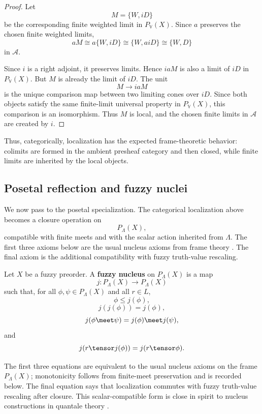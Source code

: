 \begin{proof}
Let
\[
    M=\{W,iD\}
\]
be the corresponding finite weighted limit in \(P_{\mathbb V}(X)\). Since \(a\)
preserves the chosen finite weighted limits,
\[
    aM
    \cong
    a\{W,iD\}
    \cong
    \{W,aiD\}
    \cong
    \{W,D\}
\]
in \(\mathcal A\).

Since \(i\) is a right adjoint, it preserves limits. Hence \(iaM\) is also a limit of
\(iD\) in \(P_{\mathbb V}(X)\). But \(M\) is already the limit of \(iD\). The unit
\[
    M\to iaM
\]
is the unique comparison map between two limiting cones over \(iD\). Since both
objects satisfy the same finite-limit universal property in \(P_{\mathbb V}(X)\),
this comparison is an isomorphism. Thus \(M\) is local, and the chosen finite limits
in \(\mathcal A\) are created by \(i\).
\end{proof}

Thus, categorically, localization has the expected frame-theoretic behavior: colimits
are formed in the ambient presheaf category and then closed, while finite limits are
inherited by the local objects.

\subsection{Posetal reflection and fuzzy nuclei}
\label{subsec:localizing-presheaves-posetal-reflection}

We now pass to the posetal specialization. The categorical localization above becomes
a closure operation on
\[
    P_\Lambda(X),
\]
compatible with finite meets and with the scalar action inherited from \(\Lambda\).
The first three axioms below are the usual nucleus axioms from frame theory
\cite{Johnstone1982}. The final axiom is the additional compatibility with fuzzy
truth-value rescaling.

\begin{definition}
\label{def:fuzzy-nucleus}
Let \(X\) be a fuzzy preorder. A \textbf{fuzzy nucleus} on \(P_\Lambda(X)\) is a map
\[
    j:P_\Lambda(X)\to P_\Lambda(X)
\]
such that, for all \(\phi,\psi\in P_\Lambda(X)\) and all \(r\in L\),
\[
    \phi\leq j(\phi),
\]
\[
    j(j(\phi))=j(\phi),
\]
\[
    j(\phi\meet\psi)=j(\phi)\meet j(\psi),
\]
and
\[
    j(r\tensor j(\phi))=j(r\tensor\phi).
\]
\end{definition}

The first three equations are equivalent to the usual nucleus axioms on the frame
\(P_\Lambda(X)\); monotonicity follows from finite-meet preservation and is recorded
below. The final equation says that localization commutes with fuzzy truth-value
rescaling after closure. This scalar-compatible form is close in spirit to nucleus
constructions in quantale theory \cite{Rosenthal1990}.

